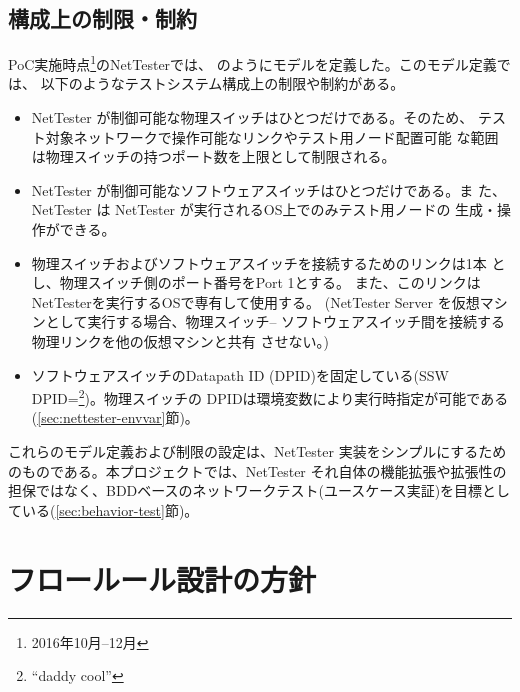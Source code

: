   \subsection{構成上の制限・制約}
  \label{sec:nettester-model-restriction}

PoC実施時点\footnote{2016年10月--12月}のNetTesterでは、
のようにモデルを定義した。このモデル定義では、
以下のようなテストシステム構成上の制限や制約がある。
\begin{itemize}
 \item NetTester が制御可能な物理スイッチはひとつだけである。そのため、
       テスト対象ネットワークで操作可能なリンクやテスト用ノード配置可能
       な範囲は物理スイッチの持つポート数を上限として制限される。
 \item NetTester が制御可能なソフトウェアスイッチはひとつだけである。ま
       た、NetTester は NetTester が実行されるOS上でのみテスト用ノードの
       生成・操作ができる。
 \item 物理スイッチおよびソフトウェアスイッチを接続するためのリンクは1本
       とし、物理スイッチ側のポート番号をPort 1とする。
       また、このリンクはNetTesterを実行するOSで専有して使用する。
       (NetTester Server を仮想マシンとして実行する場合、物理スイッチ--
       ソフトウェアスイッチ間を接続する物理リンクを他の仮想マシンと共有
       させない。)
 \item ソフトウェアスイッチのDatapath ID (DPID)を固定している(SSW
       DPID=\footnote{``daddy cool''})。物理スイッチの
       DPIDは環境変数により実行時指定が可能である
       (\ref{sec:nettester-envvar}節)。
\end{itemize}
これらのモデル定義および制限の設定は、NetTester 実装をシンプルにするため
のものである。本プロジェクトでは、NetTester それ自体の機能拡張や拡張性の
担保ではなく、BDDベースのネットワークテスト(ユースケース実証)を目標とし
ている(\ref{sec:behavior-test}節)。

 \section{フロールール設計の方針}
 \label{sec:flow-design-policy}

